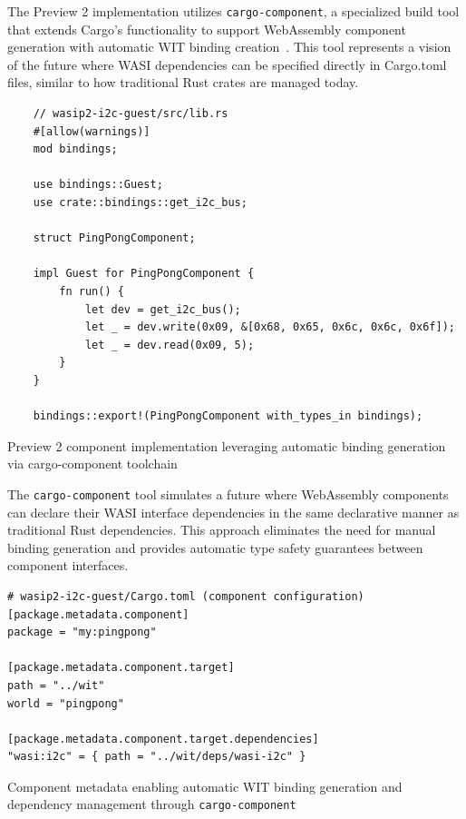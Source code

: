 The Preview 2 implementation utilizes \texttt{cargo-component}, a specialized build tool that extends Cargo's functionality to support WebAssembly component generation with automatic WIT binding creation~\cite{cargo_component_git}. This tool represents a vision of the future where WASI dependencies can be specified directly in Cargo.toml files, similar to how traditional Rust crates are managed today.

\begin{listing}[H]
    \begin{verbatim}
    // wasip2-i2c-guest/src/lib.rs
    #[allow(warnings)]
    mod bindings;
    
    use bindings::Guest;
    use crate::bindings::get_i2c_bus;
    
    struct PingPongComponent;
    
    impl Guest for PingPongComponent {
        fn run() {
            let dev = get_i2c_bus();
            let _ = dev.write(0x09, &[0x68, 0x65, 0x6c, 0x6c, 0x6f]);
            let _ = dev.read(0x09, 5);
        }
    }
    
    bindings::export!(PingPongComponent with_types_in bindings);
    \end{verbatim}
    \caption{Preview 2 component implementation leveraging automatic binding generation via cargo-component toolchain}
    \label{lst:preview2-guest}
\end{listing}

The \texttt{cargo-component} tool simulates a future where WebAssembly components can declare their WASI interface dependencies in the same declarative manner as traditional Rust dependencies. This approach eliminates the need for manual binding generation and provides automatic type safety guarantees between component interfaces.

\begin{listing}[H]
\begin{verbatim}
# wasip2-i2c-guest/Cargo.toml (component configuration)
[package.metadata.component]
package = "my:pingpong"

[package.metadata.component.target]
path = "../wit"
world = "pingpong"

[package.metadata.component.target.dependencies]
"wasi:i2c" = { path = "../wit/deps/wasi-i2c" }
\end{verbatim}
\caption{Component metadata enabling automatic WIT binding generation and dependency management through \texttt{cargo-component}}
\label{lst:component-config}
\end{listing}

